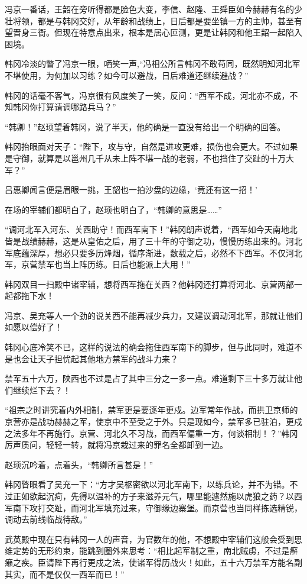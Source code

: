 冯京一番话，王韶在旁听得都是脸色大变，李信、赵隆、王舜臣如今赫赫有名的少壮将领，都是与韩冈交好，从年龄和战绩上，日后都是要坐镇一方的主帅，甚至有望晋身三衙。但现在特意点出来，根本是居心叵测，更是让韩冈和他王韶一起陷入困境。

韩冈冷淡的瞥了冯京一眼，哂笑一声,“冯相公所言韩冈不敢苟同，既然明知河北军不堪使用，为何加以习练？如今可以避战，日后难道还继续避战？”

韩冈的话毫不客气，冯京很有风度笑了一笑，反问：“西军不成，河北亦不成，不知韩冈你打算请调哪路兵马？”

“韩卿！”赵顼望着韩冈，说了半天，他的确是一直没有给出一个明确的回答。

韩冈抬眼面对天子：“陛下，攻与守，自然是进攻更难，损伤也会更大。不过如果是守御，就算是以邕州几千从未上阵不堪一战的老弱，不也挡住了交趾的十万大军？”

吕惠卿闻言便是眉眼一挑，王韶也一拍沙盘的边缘，‘竟还有这一招！’

在场的宰辅们都明白了，赵顼也明白了，“韩卿的意思是……”

“调河北军入河东、关西助守！而西军南下！”韩冈朗声说着，“西军如今天南地北皆是战绩赫赫，这是从皇佑之后，用了三十年的守御之功，慢慢历练出来的。河北军底蕴深厚，想必只要多历烽烟，循序渐进，数载之后，必然不下西军。不仅河北军，京营禁军也当上阵历练。日后也能派上大用！”

韩冈双目一扫殿中诸宰辅，想将西军拖在关西？他韩冈还打算将河北、京营两部一起都拖下水！

冯京、吴充等人一个劲的说关西不能再减少兵力，又建议调动河北军，那就让他们如愿以偿好了！

韩冈心底冷笑不已，这样的说法的确会拖住西军南下的脚步，但与此同时，难道不是也会让天子担忧起其他地方禁军的战斗力来？

禁军五十六万，陕西也不过是占了其中三分之一多一点。难道剩下三十多万就让他们继续烂下去？！

“祖宗之时讲究着内外相制，禁军更是要逐年更戍。边军常年作战，而拱卫京师的京营亦是战功赫赫之军，使京中不至受之于外。只是现如今，禁军多已驻泊，更戍之法多年不再施行。京营、河北久不习战，而西军偏重一方，何谈相制！？”韩冈厉声质问，轻轻一转，就将冯京栽过来的罪名全都卸到一边。

赵顼沉吟着，点着头，“韩卿所言甚是！”

韩冈瞥眼看了吴充一下：“方才吴枢密欲以河北军南下，以练兵论，并不为错。不过正如欲起沉疴，先得以温补的方子来滋养元气，哪里能遽然施以虎狼之药？以西军南下攻打交趾，而河北军填充过来，守御缘边寨堡。而京营也当同样拣选精锐，调动去前线临战待敌。”

武英殿中现在只有韩冈一人的声音，为官数年的他，不想殿中宰辅们这般会受到思维定势的无形约束，能跳到圈外来思考：“相比起军制之重，南北贼虏，不过是癣癞之疾。臣请陛下再行更戍之法，使诸军得历战火！如此，五十六万禁军方能名副其实，而不是仅仅一西军而已！”

